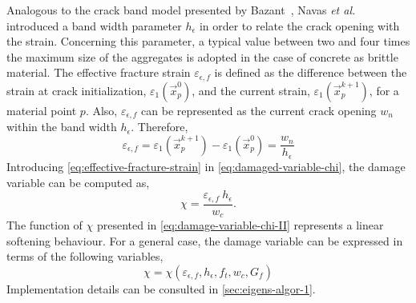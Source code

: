 \message{ !name(2020_EFM_MPM_Eigensoftening.tex)}\documentclass[preprint,12pt,a4paper]{elsarticle}
\begin{document}
Analogous to the crack band model presented by
Bazant~\cite{Bazant83}, Navas {\it et al.} \cite{Navas_2018_ES}
\cite{Navas_2017_ES} introduced a band width parameter $h_{\epsilon}$ in order to relate the crack opening with the strain.
Concerning this parameter, a typical value between two and
four times the maximum size of the aggregates is adopted in the case of
concrete as brittle material. The effective fracture strain
$\varepsilon_{\epsilon,f}$ is defined as the difference between the strain at crack initialization,
$\varepsilon_1(\vec{x}_p^{0})$, and the current strain, $\varepsilon_1(\vec{x}_p^{k+1})$, for a material point $p$. Also,
$\varepsilon_{\epsilon,f}$ can be represented as the current crack
opening $w_n$ within the band width $h_{\epsilon}$. Therefore, 
\begin{equation}
  \label{eq:effective-fracture-strain}
  \varepsilon_{\epsilon,f} = \varepsilon_1(\vec{x}_p^{k+1}) -
  \varepsilon_1(\vec{x}_p^{0}) = \frac{w_n}{h_{\epsilon}}
\end{equation}
Introducing \eqref{eq:effective-fracture-strain} in
\eqref{eq:damaged-variable-chi}, the damage variable can be computed
as,
\begin{equation}
  \label{eq:damage-variable-chi-II}
\chi = \frac{\varepsilon_{\epsilon,f}\ h_{\epsilon}}{w_c}.  
\end{equation}
The function of $\chi$ presented in \eqref{eq:damage-variable-chi-II}
represents a linear softening behaviour. For a general case, the
damage variable can be expressed in terms of the following variables,
\begin{equation}
  \label{eq:damage-variable-chi-III}
  \chi = \chi(\varepsilon_{\epsilon,f}, h_{\epsilon}, f_t, w_c, G_f)
\end{equation}
Implementation details can be consulted in \ref{sec:eigens-algor-1}.
\end{document}
